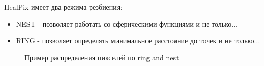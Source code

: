 \documentclass[14pt]{article} %
\begin{document}
HealPix имеет два режима резбиения:
\begin{itemize}
\item NEST - позволяет работать со сферическими функциями и не только...

\item RING - позволяет определять минимальное расстояние до точек и не только...
\end{itemize}

\begin{figure}[h]
\begin{minipage}[h]{0.48\linewidth}
\end{minipage}
\hfill
\begin{minipage}[h]{0.48\linewidth}
\end{minipage}
\caption{Пример распределения  пикселей по ring and nest}
\label{ris:moll_nside32_healpix}
\end{figure}
\end{document}
